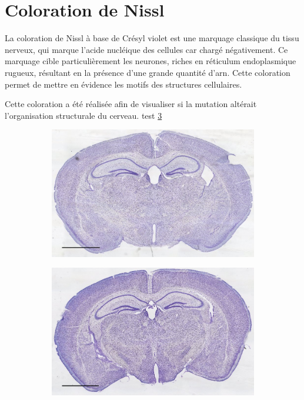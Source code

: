 \section{Coloration de Nissl}
\label{sec:NisslResultat}
La coloration de Nissl à base de Crésyl violet est une marquage classique du tissu nerveux, qui marque l'acide nucléique des cellules car chargé négativement. Ce marquage cible particulièrement les neurones, riches en réticulum endoplasmique rugueux, résultant en la présence d'une grande quantité d'\acrshort{arn}. Cette coloration permet de mettre en évidence les motifs des structures cellulaires.

Cette coloration a été réalisée afin de visualiser si la mutation \mcrd altérait l'organisation structurale du cerveau. test \cref{fig:FemMutNissl}

\begin{figure}[h]
	\begin{center}
		\begin{subfigure}[h]{0.49\textwidth}%
			\caption{}
			\label{fig:FemWTNissl}
			\includegraphics[width=\textwidth]{./Images/Nissl/FemWT.jpg}
		\end{subfigure}
		\begin{subfigure}[h]{0.49\textwidth}%
			\caption{}
			\label{fig:FemMutNissl}
			\includegraphics[width=\textwidth]{./Images/Nissl/FemMut.jpg}

\end{subfigure}
\end{center}
\end{figure}
